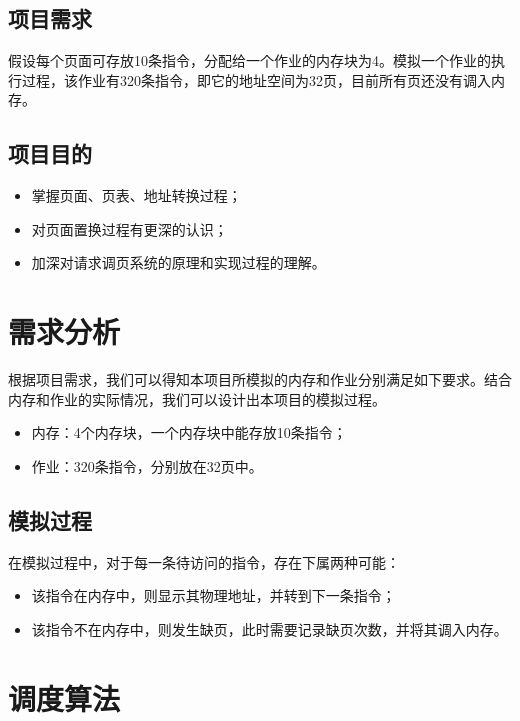 \documentclass{article}
\begin{document}
\begin{CJK}{UTF8}{gbsn}
\subsection{项目需求}
假设每个页面可存放10条指令，分配给一个作业的内存块为4。模拟一个作业的执行过程，该作业有320条指令，即它的地址空间为32页，目前所有页还没有调入内存。

\subsection{项目目的}
\begin{itemize}
	\setlength{\itemsep}{0.5pt}
	\item 掌握页面、页表、地址转换过程；
	\item 对页面置换过程有更深的认识；
	\item 加深对请求调页系统的原理和实现过程的理解。
\end{itemize}

\vspace{3em}

\section{需求分析}
根据项目需求，我们可以得知本项目所模拟的内存和作业分别满足如下要求。结合内存和作业的实际情况，我们可以设计出本项目的模拟过程。

\begin{itemize}
	\setlength{\itemsep}{0.5pt}
	\item 内存：4个内存块，一个内存块中能存放10条指令；
	\item 作业：320条指令，分别放在32页中。
\end{itemize}



\subsection{模拟过程}
在模拟过程中，对于每一条待访问的指令，存在下属两种可能：
\begin{itemize}
	\setlength{\itemsep}{0.5pt}
	\item 该指令在内存中，则显示其物理地址，并转到下一条指令；
	\item 该指令不在内存中，则发生缺页，此时需要记录缺页次数，并将其调入内存。
\end{itemize}

\vspace{3em}

\section{调度算法}


\end{CJK}
\end{document}
